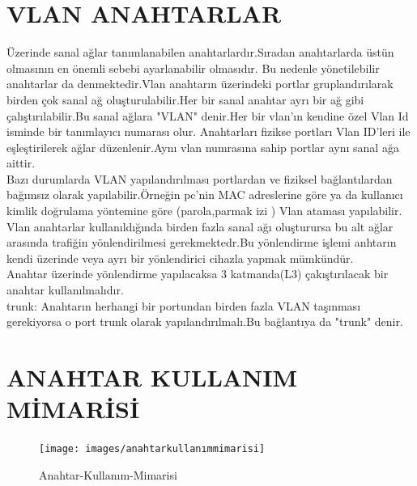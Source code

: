 \section*{VLAN ANAHTARLAR}
Üzerinde sanal ağlar tanımlanabilen anahtarlardır.Sıradan anahtarlarda üstün olmasının en önemli sebebi ayarlanabilir olmasıdır.
Bu nedenle yönetilebilir anahtarlar da denmektedir.Vlan anahtarın üzerindeki portlar gruplandırılarak birden çok sanal ağ oluşturulabilir.Her bir sanal anahtar ayrı bir ağ gibi çalıştırılabilir.Bu sanal ağlara "VLAN" denir.Her bir vlan'ın kendine özel Vlan Id isminde bir tanımlayıcı numarası olur.
Anahtarları fizikse portları Vlan ID'leri ile eşleştirilerek ağlar düzenlenir.Aynı vlan numrasına sahip portlar aynı sanal ağa aittir.\\
Bazı durumlarda VLAN yapılandırılması portlardan ve fiziksel bağlantılardan bağımsız olarak yapılabilir.Örneğin pc'nin MAC adreslerine göre ya da kullanıcı kimlik doğrulama yöntemine göre (parola,parmak izi ) Vlan ataması yapılabilir.\\
Vlan anahtarlar kullanıldığında birden fazla sanal ağı oluşturursa bu alt ağlar arasında trafiğin yönlendirilmesi gerekmektedr.Bu yönlendirme işlemi anhtarın kendi üzerinde veya ayrı bir yönlendirici cihazla yapmak mümkündür.\\
Anahtar üzerinde yönlendirme yapılacaksa 3 katmanda(L3) çakıştırılacak bir anahtar kullanılmalıdır.\\
trunk: Anahtarın herhangi bir portundan birden fazla VLAN taşınması gerekiyorsa o port trunk olarak yapılandırılmalı.Bu bağlantıya da "trunk" denir.
\section*{ANAHTAR KULLANIM MİMARİSİ}
\begin{figure}[ht]
    \centering
    \texttt{[image: images/anahtarkullanımmimarisi]}
    \caption{Anahtar-Kullanım-Mimarisi}
    \label{fig:anahtar_kullanım_mimarisi}
\end{figure}

